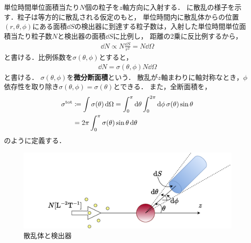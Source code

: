 \documentclass{report}
\begin{document}
  単位時間単位面積当たり$N$個の粒子を$z$軸方向に入射する．
  に散乱の様子を示す．粒子は等方的に散乱される仮定のもと，
  単位時間内に散乱体からの位置$(r,\theta,\phi)$にある面積$\dd{S}$の検出器に到達する粒子数は，入射した単位時間単位面積当たり粒子数$N$と検出器の面積$\dd{S}$に比例し，
  距離の2乗に反比例するから，
  \begin{align}
    \dd{N} \propto N \frac{\dd{S}}{r^2} = N\dd{\Omega}
  \end{align}
  と書ける．比例係数を$\sigma (\theta, \phi)$とすると，
  \begin{align}
    \dd{N} = \sigma(\theta, \phi) N \dd{\Omega}
  \end{align}
  と書ける．
  $\sigma(\theta, \phi)$を\textbf{微分断面積}という．
  散乱が$z$軸まわりに軸対称なとき，$\phi$依存性を取り除き$\sigma(\theta, \phi) = \sigma (\theta)$とできる．
  また，全断面積を，
  \begin{align}
    \sigma^{\mathrm{tot}} &\coloneqq \int \sigma(\theta) \dd{\Omega} = \int_{0}^{\pi}\dd{\theta}\int_{0}^{2\pi}\dd{\phi}\sigma(\theta) \sin\theta \\ 
    &= 2\pi \int_{0}^{\pi} \sigma(\theta) \sin \theta \dd{\theta}\label{total-area}
  \end{align}
  のように定義する．
  \begin{figure}[H]
    \centering
    \includegraphics[width = 0.6\columnwidth]{fig/scattering_diagram.pdf}
    \caption{散乱体と検出器}\label{scattering_detection}
  \end{figure}
\end{document}
